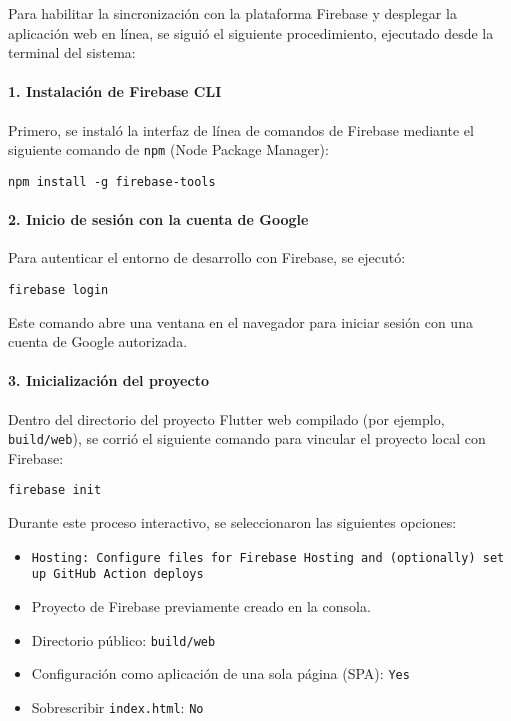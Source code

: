 Para habilitar la sincronización con la plataforma Firebase y desplegar la aplicación web en línea, se siguió el siguiente procedimiento, ejecutado desde la terminal del sistema:

\paragraph{1. Instalación de Firebase CLI}

Primero, se instaló la interfaz de línea de comandos de Firebase mediante el siguiente comando de \texttt{npm} (Node Package Manager):

\begin{verbatim}
npm install -g firebase-tools
\end{verbatim}

\paragraph{2. Inicio de sesión con la cuenta de Google}

Para autenticar el entorno de desarrollo con Firebase, se ejecutó:

\begin{verbatim}
firebase login
\end{verbatim}

Este comando abre una ventana en el navegador para iniciar sesión con una cuenta de Google autorizada.

\paragraph{3. Inicialización del proyecto}

Dentro del directorio del proyecto Flutter web compilado (por ejemplo, \texttt{build/web}), se corrió el siguiente comando para vincular el proyecto local con Firebase:

\begin{verbatim}
firebase init
\end{verbatim}

Durante este proceso interactivo, se seleccionaron las siguientes opciones:

\begin{itemize}
    \item \texttt{Hosting: Configure files for Firebase Hosting and (optionally) set up GitHub Action deploys}
    \item Proyecto de Firebase previamente creado en la consola.
    \item Directorio público: \texttt{build/web}
    \item Configuración como aplicación de una sola página (SPA): \texttt{Yes}
    \item Sobrescribir \texttt{index.html}: \texttt{No}
\end{itemize}

